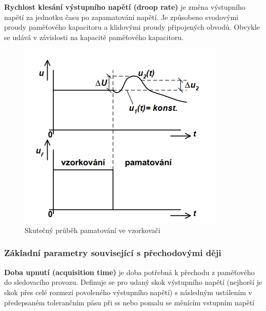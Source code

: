\textbf{Rychlost klesání výstupního napětí (droop rate)} je změna výstupního napětí za jednotku
času po zapamatování napětí. Je způsobeno svodovými proudy paměťového kapacitoru a
klidovými proudy připojených obvodů. Obvykle se udává v závislosti na kapacitě
paměťového kapacitoru.
   \begin{figure}[h]
   \begin{center}
     \includegraphics[scale=0.6]{images/Droop.png}
   \end{center}
   \caption{Skutečný průběh pamatování ve vzorkovači}
  \end{figure}

\subsubsection{Základní parametry související s přechodovými ději}
\textbf{Doba upnutí (acquisition time)} je doba potřebná k přechodu z paměťového do sledovacího provozu. Definuje se pro udaný skok výstupního napětí (nejhorší je skok přes celé rozmezí povoleného výstupního napětí) s následným ustálením v předepsaném tolerančním pásu při ss nebo pomalu se měnícím vstupním napětí

